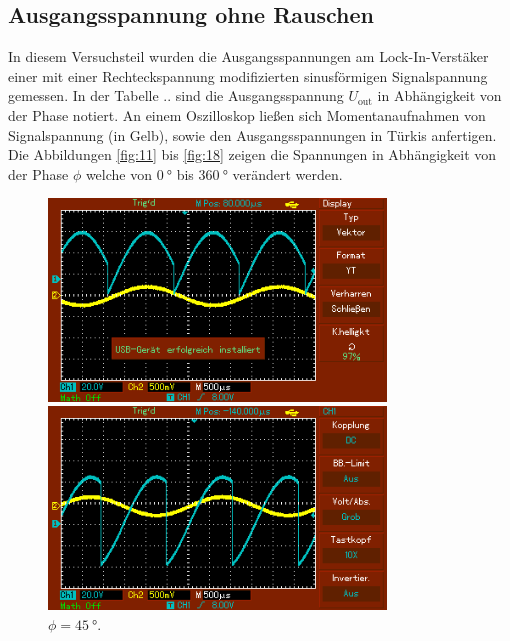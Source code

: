 \subsection{Ausgangsspannung ohne Rauschen}
In diesem Versuchsteil wurden die Ausgangsspannungen am Lock-In-Verstäker einer mit einer Rechteckspannung modifizierten sinusförmigen Signalspannung gemessen. In der Tabelle ..
sind die Ausgangsspannung $U_{\text{out}}$ in Abhängigkeit von der Phase notiert. An einem Oszilloskop ließen sich Momentanaufnahmen von Signalspannung (in Gelb), sowie den Ausgangsspannungen in Türkis anfertigen.
Die Abbildungen \ref{fig:11} bis \ref{fig:18} zeigen die Spannungen in Abhängigkeit von der Phase $\phi$ welche von $\SI{0}{\degree}$ bis $\SI{360}{\degree}$ verändert werden.
\begin{figure}
    \begin{minipage}{0.5\textwidth}
        \centering
        \includegraphics[width=0.8\textwidth]{bilder/0ohne.png}
        \caption{$\phi = \SI{0}{\degree}$.} 
        \label{fig:11}
    \end{minipage}
    \hfill
    \begin{minipage}{0.5\textwidth}
        \centering
        \includegraphics[width=0.8\textwidth]{bilder/45ohne.png}
        \caption{$\phi = \SI{45}{\degree}$.} 
        \label{fig:12}

\end{minipage}
\end{figure}
